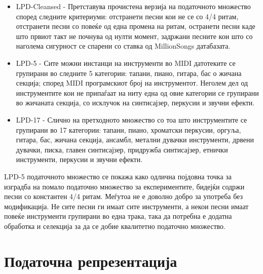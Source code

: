 \begin{itemize}
    \item LPD-Cleansed - Претставува прочистена верзија на податочното множество според следните критериуми: отстранети песни кои не се со 4/4 ритам, отстранети песни со повеќе од една промена на ритам, остранети песни каде што првиот такт не почнува од нулти момент, задржани песните кои што со наголема сигурност се спарени со ставка од MillionSongs датабазата.
    \item LPD-5 - Сите можни инстанци на инструменти во MIDI датотеките се групирани во следните 5 категории: тапани, пиано, гитара, бас о жичана секција; според MIDI програмскиот број на инструментот. Неголем дел од инструментите кои не припаѓаат на ниту една од овие категории се групирани во жичаната секција, со исклучок на синтисајзер, перкусии и звучни ефекти.
    \item LPD-17 - Слично на претходното множество со тоа што инструментите се групирани во 17 категории: тапани, пиано, хроматски перкусии, оргуља, гитара, бас, жичана секција, ансамбл, метални дувачки инструменти, дрвени дувачки, писка, главен синтисајзер, придружба синтисајзер, етнички инструменти, перкусии и звучни ефекти.
\end{itemize}

LPD-5 податочното множество се покажа како одлична појдовна точка за изградба на помало податочно множество за експериментите, бидејќи содржи песни со константен 4/4 ритам. Меѓутоа не е доволно добро за употреба без модификација. Не сите песни ги имаат сите инструменти, а некои песни имаат повеќе инструменти групирани во една трака, така да потребна е додатна обработка и селекција за да се добие квалитетно податочно множество.

\section{Податочна репрезентација}

